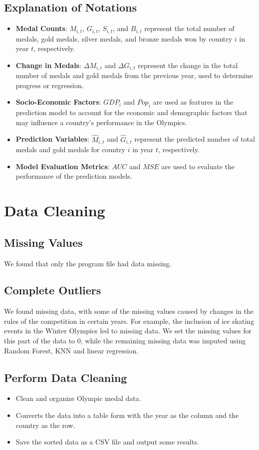 \documentclass{mcmthesis}
\begin{document}
  \subsection*{Explanation of Notations}
  \begin{itemize}
      \item \textbf{Medal Counts}: \( M_{i,t} \), \( G_{i,t} \), \( S_{i,t} \), and \( B_{i,t} \) represent the total number of medals, gold medals, silver medals, and bronze medals won by country \( i \) in year \( t \), respectively.
      \item \textbf{Change in Medals}: \( \Delta M_{i,t} \) and \( \Delta G_{i,t} \) represent the change in the total number of medals and gold medals from the previous year, used to determine progress or regression.
      \item \textbf{Socio-Economic Factors}: \( GDP_i \) and \( Pop_i \) are used as features in the prediction model to account for the economic and demographic factors that may influence a country's performance in the Olympics.
      \item \textbf{Prediction Variables}: \( \hat{M}_{i,t} \) and \( \hat{G}_{i,t} \) represent the predicted number of total medals and gold medals for country \( i \) in year \( t \), respectively.
      \item \textbf{Model Evaluation Metrics}: \( AUC \) and \( MSE \) are used to evaluate the performance of the prediction models.
  \end{itemize}
 

  \section{Data Cleaning}
  \subsection{Missing Values}
  We found that only the program file had data missing.
  \subsection{Complete Outliers }
  We found missing data, with some of the missing values caused by changes in the rules of the competition in certain years. For example, the inclusion of ice skating events in the Winter Olympics led to missing data. We set the missing values for this part of the data to 0, while the remaining missing data was imputed using Random Forest, KNN and linear regression.
  \subsection{Perform Data Cleaning}
  \begin{itemize}
    \item Clean and organize Olympic medal data.
    \item Converts the data into a table form with the year as the column and the country as the row.
    \item Save the sorted data as a CSV file and output some results.
    \end{itemize}
\end{document}
